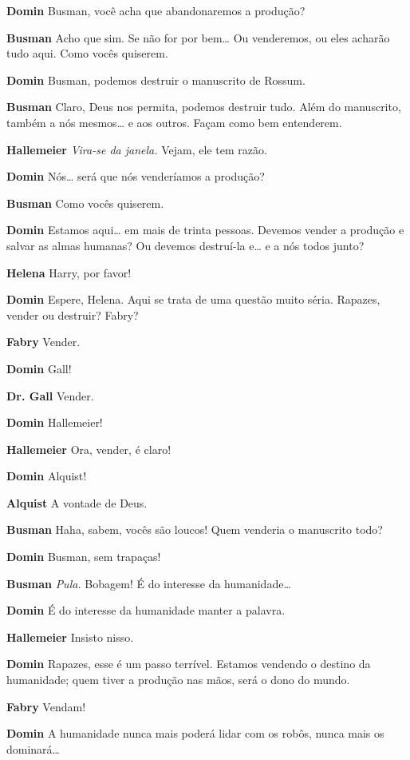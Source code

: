 \textbf{Domin} Busman, você acha que abandonaremos a produção?

\textbf{Busman} Acho que sim. Se não for por bem\ldots{} Ou venderemos, ou
eles acharão tudo aqui. Como vocês quiserem.

\textbf{Domin} Busman, podemos destruir o manuscrito de Rossum.

\textbf{Busman} Claro, Deus nos permita, podemos destruir tudo. Além do manuscrito,
também a nós mesmos\ldots{} e aos outros. Façam como bem entenderem.

\textbf{Hallemeier} \emph{Vira-se da janela.} Vejam, ele tem razão.

\textbf{Domin} Nós\ldots{} será que nós venderíamos a produção?

\textbf{Busman} Como vocês quiserem.

\textbf{Domin} Estamos aqui\ldots{} em mais de trinta pessoas. Devemos vender a
produção e salvar as almas humanas? Ou devemos destruí-la e\ldots{} e a nós
todos junto?

\textbf{Helena} Harry, por favor!

\textbf{Domin} Espere, Helena. Aqui se trata de uma questão muito séria. Rapazes, vender
ou destruir? Fabry?

\textbf{Fabry} Vender.

\textbf{Domin} Gall!

\textbf{Dr. Gall} Vender.

\textbf{Domin} Hallemeier!

\textbf{Hallemeier} Ora, vender, é claro!

\textbf{Domin} Alquist!

\textbf{Alquist} A vontade de Deus.

\textbf{Busman} Haha, sabem, vocês são loucos! Quem venderia o manuscrito todo?

\textbf{Domin} Busman, sem trapaças!

\textbf{Busman} \emph{Pula.} Bobagem! É do interesse da humanidade\ldots{}

\textbf{Domin} É do interesse da humanidade manter a palavra.

\textbf{Hallemeier} Insisto nisso.

\textbf{Domin} Rapazes, esse é um passo terrível. Estamos vendendo o destino da
humanidade; quem tiver a produção nas mãos, será o dono do mundo.

\textbf{Fabry} Vendam!

\textbf{Domin} A humanidade nunca mais poderá lidar com os robôs, nunca mais os
dominará\ldots{}

